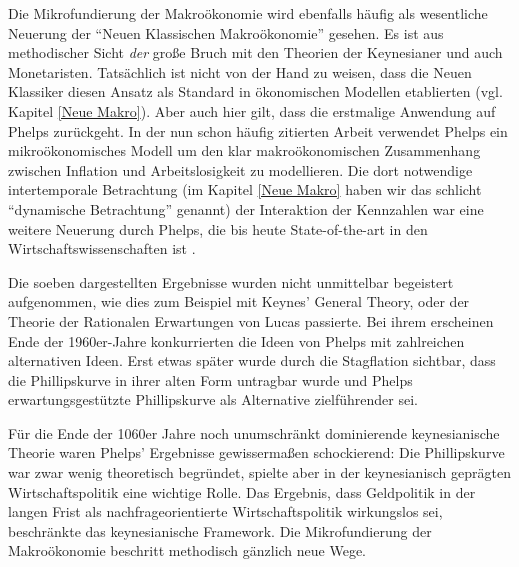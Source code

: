 Die Mikrofundierung der Makroökonomie wird ebenfalls häufig als wesentliche Neuerung der "`Neuen Klassischen Makroökonomie"' gesehen. Es ist aus methodischer Sicht \textit{der} große Bruch mit den Theorien der Keynesianer und auch Monetaristen. Tatsächlich ist nicht von der Hand zu weisen, dass die Neuen Klassiker diesen Ansatz als Standard in ökonomischen Modellen etablierten (vgl. Kapitel \ref{Neue Makro}). Aber auch hier gilt, dass die erstmalige Anwendung auf Phelps zurückgeht. In der nun schon häufig zitierten Arbeit \textcite{Phelps1968} verwendet Phelps ein mikroökonomisches Modell um den klar makroökonomischen Zusammenhang zwischen Inflation und Arbeitslosigkeit zu modellieren. Die dort notwendige intertemporale Betrachtung (im Kapitel \ref{Neue Makro} haben wir das schlicht "`dynamische Betrachtung"' genannt) der Interaktion der Kennzahlen war eine weitere Neuerung durch Phelps, die bis heute State-of-the-art in den Wirtschaftswissenschaften ist \parencite[S. 9]{Nobelpreis-Komitee2006}.

Die soeben dargestellten Ergebnisse wurden nicht unmittelbar begeistert aufgenommen, wie dies zum Beispiel mit Keynes' General Theory, oder der Theorie der Rationalen Erwartungen von Lucas passierte. Bei ihrem erscheinen Ende der 1960er-Jahre konkurrierten die Ideen von Phelps mit zahlreichen alternativen Ideen. Erst etwas später wurde durch die Stagflation sichtbar, dass die Phillipskurve in ihrer alten Form untragbar wurde und Phelps erwartungsgestützte Phillipskurve als Alternative zielführender sei.

Für die Ende der 1060er Jahre noch unumschränkt dominierende keynesianische Theorie waren Phelps' Ergebnisse gewissermaßen schockierend: Die Phillipskurve war zwar wenig theoretisch begründet, spielte aber in der keynesianisch geprägten Wirtschaftspolitik eine wichtige Rolle. Das Ergebnis, dass Geldpolitik in der langen Frist als nachfrageorientierte Wirtschaftspolitik wirkungslos sei, beschränkte das keynesianische Framework. Die Mikrofundierung der Makroökonomie beschritt methodisch gänzlich neue Wege. 

